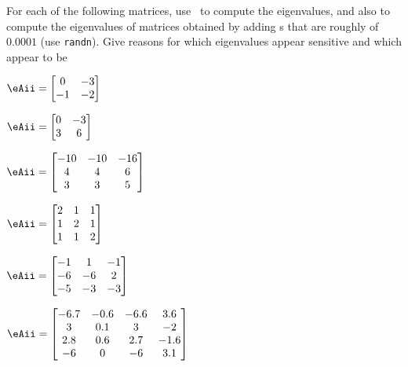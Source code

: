 \begin{exercise}  
For each of the following matrices, use \script\ to compute the eigenvalues, and also to compute the eigenvalues of matrices obtained by adding s that are roughly of ~\(0.0001\) (use \verb|randn|).
Give reasons for which eigenvalues appear sensitive and which appear to be 
\begin{Parts}
\item \(\eAii=\begin{bmatrix} 0&-3\\-1&-2 \end{bmatrix}\)

\item \(\eAii=\begin{bmatrix} 0&-3\\3&6 \end{bmatrix}\)

\item \(\eAii=\begin{bmatrix} -10 & -10 & -16
\\4 & 4 & 6
\\3 & 3 & 5 \end{bmatrix}\)

\item \(\eAii=\begin{bmatrix} 2&1&1
\\1&2&1
\\1&1&2 \end{bmatrix}\)

\item \(\eAii=\begin{bmatrix} -1 & 1 & -1
\\-6 & -6 & 2
\\-5 & -3 & -3 \end{bmatrix}\)

\item \(\eAii=\begin{bmatrix} -6.7 & -0.6 & -6.6 & 3.6
\\3 & 0.1 & 3 & -2
\\2.8 & 0.6 & 2.7 & -1.6
\\-6 & 0 & -6 & 3.1 \end{bmatrix}\)
\setbox\ajrqrbox\hbox{\qrcode{%
[-6.7 -0.6 -6.6 3.6
3 0.1 3 -2
2.8 0.6 2.7 -1.6
-6 0 -6 3.1]
}}\marginajrbox%


\end{Parts}
\end{exercise}
